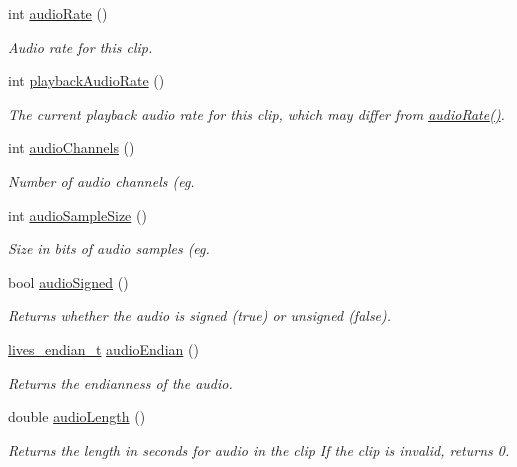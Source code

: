 \begin{DoxyCompactItemize}
int \hyperlink{classlives_1_1clip_a9106502f20d85061483b713f296b457e}{audio\-Rate} ()
\begin{DoxyCompactList}\small\item\em Audio rate for this clip. \end{DoxyCompactList}\item 
int \hyperlink{classlives_1_1clip_a59cc4153ad00eb210d9e96b325338022}{playback\-Audio\-Rate} ()
\begin{DoxyCompactList}\small\item\em The current playback audio rate for this clip, which may differ from \hyperlink{classlives_1_1clip_a9106502f20d85061483b713f296b457e}{audio\-Rate()}. \end{DoxyCompactList}\item 
int \hyperlink{classlives_1_1clip_af961407642f31a02fe6e965f55a06661}{audio\-Channels} ()
\begin{DoxyCompactList}\small\item\em Number of audio channels (eg. \end{DoxyCompactList}\item 
int \hyperlink{classlives_1_1clip_a71b4222b98c6438f6d7a045ba76834d4}{audio\-Sample\-Size} ()
\begin{DoxyCompactList}\small\item\em Size in bits of audio samples (eg. \end{DoxyCompactList}\item 
bool \hyperlink{classlives_1_1clip_aaa350d735b9f44197dc217d507196529}{audio\-Signed} ()
\begin{DoxyCompactList}\small\item\em Returns whether the audio is signed (true) or unsigned (false). \end{DoxyCompactList}\item 
\hyperlink{liblives_8hpp_a1f91078fecf5ea3583c71ed1db238393}{lives\-\_\-endian\-\_\-t} \hyperlink{classlives_1_1clip_a42e672b29e36c890dbea26719257cc9a}{audio\-Endian} ()
\begin{DoxyCompactList}\small\item\em Returns the endianness of the audio. \end{DoxyCompactList}\item 
double \hyperlink{classlives_1_1clip_af7460c94c508e8712b0eadd8bb5e0f16}{audio\-Length} ()
\begin{DoxyCompactList}\small\item\em Returns the length in seconds for audio in the clip If the clip is invalid, returns 0. \end{DoxyCompactList}\item 

\end{DoxyCompactItemize}
